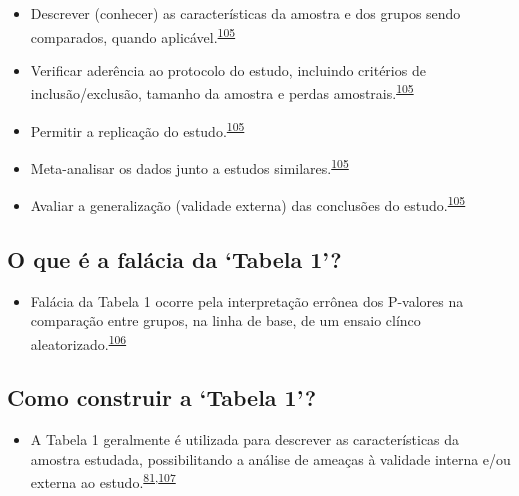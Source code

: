 \documentclass[
  a4paper,
]{book}
\providecommand{\tightlist}{%
  \setlength{\itemsep}{0pt}\setlength{\parskip}{0pt}}
\begin{document}
\begin{itemize}
\item
  Descrever (conhecer) as características da amostra e dos grupos sendo comparados, quando aplicável.\textsuperscript{\protect\hyperlink{ref-chen2020}{105}}
\item
  Verificar aderência ao protocolo do estudo, incluindo critérios de inclusão/exclusão, tamanho da amostra e perdas amostrais.\textsuperscript{\protect\hyperlink{ref-chen2020}{105}}
\item
  Permitir a replicação do estudo.\textsuperscript{\protect\hyperlink{ref-chen2020}{105}}
\item
  Meta-analisar os dados junto a estudos similares.\textsuperscript{\protect\hyperlink{ref-chen2020}{105}}
\item
  Avaliar a generalização (validade externa) das conclusões do estudo.\textsuperscript{\protect\hyperlink{ref-chen2020}{105}}
\end{itemize}

\hypertarget{o-que-uxe9-a-faluxe1cia-da-tabela-1}{%
\subsection{O que é a falácia da `Tabela 1'?}\label{o-que-uxe9-a-faluxe1cia-da-tabela-1}}

\begin{itemize}
\tightlist
\item
  Falácia da Tabela 1 ocorre pela interpretação errônea dos P-valores na comparação entre grupos, na linha de base, de um ensaio clínco aleatorizado.\textsuperscript{\protect\hyperlink{ref-pijls2022}{106}}
\end{itemize}

\hypertarget{como-construir-a-tabela-1}{%
\subsection{Como construir a `Tabela 1'?}\label{como-construir-a-tabela-1}}

\begin{itemize}
\tightlist
\item
  A Tabela 1 geralmente é utilizada para descrever as características da amostra estudada, possibilitando a análise de ameaças à validade interna e/ou externa ao estudo.\textsuperscript{\protect\hyperlink{ref-greenhalgh1997}{81},\protect\hyperlink{ref-Hayes-Larson2019}{107}}
\end{itemize}
\end{document}
